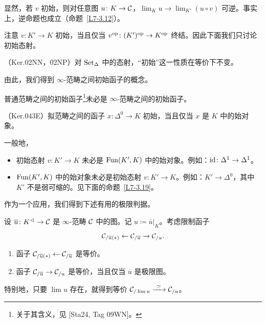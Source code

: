 \nitem\label{L7-3.3} 显然，若 $v$ 初始，则对任意图 $u\colon K\to\mathcal{C}$，$\lim_K u\to\lim_{K'}(u\circ v)$ 可逆。事实上，逆命题也成立（命题~\ref{L7-3.12}）。

\nitem\label{L7-3.4} 注意 $v\colon K'\to K$ 初始，当且仅当 $v^{\mathrm{op}}\colon(K')^{\mathrm{op}}\to K^{\mathrm{op}}$ 终结。因此下面我们只讨论初始态射。

\begin{proposition}\label{L7-3.5}
（Ker.02NN，02NP）对 $\operatorname{Set}_\Delta$ 中的态射，“初始”这一性质在等价下不变。
\end{proposition}

\nitem\label{L7-3.6} 由此，我们得到 $\infty$-范畴之间初始函子的概念。

\begin{warning}\label{L7-3.7}
普通范畴之间的初始函子\footnote{关于其含义，见 [Sta24, Tag 09WN]。}未必是 $\infty$-范畴之间的初始函子。
\end{warning}

\begin{proposition}\label{L7-3.8}
（Ker.043E）拟范畴之间的函子 $x\colon\Delta^0\to K$ 初始，当且仅当 $x$ 是 $K$ 中的始对象。
\end{proposition}

\begin{warning}\label{L7-3.9}
一般地，
\begin{itemize}[leftmargin=2.2em,itemsep=0.1em]
\item 初始态射 $v\colon K'\to K$ 未必是 $\operatorname{Fun}(K',K)$ 中的始对象。例如：$\operatorname{id}\colon\Delta^1\to\Delta^1$。
\item $\operatorname{Fun}(K',K)$ 中的始对象未必是初始态射 $v\colon K'\to K$。例如：$K'\to\Delta^0$，其中 $K'$ 不是弱可缩的。见下面的命题~\ref{L7-3.19}。
\end{itemize}
\end{warning}

\nitem\label{L7-3.10} 作为一个应用，我们得到下述有用的极限判据。

\begin{proposition}\label{L7-3.11}
设 $\overline u\colon K^{\lhd}\to\mathcal{C}$ 是 $\infty$-范畴 $\mathcal{C}$ 中的图。记 $u\coloneqq\overline u|_K$。考虑限制函子
\[
\mathcal{C}_{/\overline u(*)}\leftarrow\mathcal{C}_{/\overline u}\to\mathcal{C}_{/u}.
\]
\begin{enumerate}[label=(\arabic*),leftmargin=2.4em,itemsep=0.1em]
\item 函子 $\mathcal{C}_{/\overline u(*)}\leftarrow\mathcal{C}_{/\overline u}$ 是等价。
\item 函子 $\mathcal{C}_{/\overline u}\to\mathcal{C}_{/u}$ 是等价，当且仅当 $\overline u$ 是极限图。
\end{enumerate}
特别地，只要 $\lim u$ 存在，就得到等价 $\cC_{/\lim u}\xrightarrow{\ \simeq\ }\cC_{/u}$。
\end{proposition}

